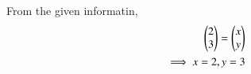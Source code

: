 From the given informatin, 
\begin{align}
	\begin{pmatrix}2\\3\end{pmatrix} = \begin{pmatrix}x \\ y\end{pmatrix} 
	\\
	\implies x = 2, y = 3
\end{align}

